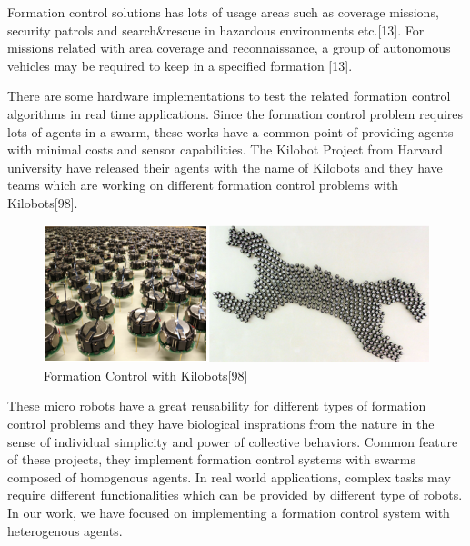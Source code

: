 Formation control solutions has lots of usage areas such as coverage missions, security patrols and search$\&$rescue in hazardous environments etc.[13]. For missions related with area coverage and reconnaissance, a group of autonomous vehicles may be required to keep in a specified formation [13].  

There are some hardware implementations to test the related formation control algorithms in real time applications. Since the formation control problem requires lots of agents in a swarm, these works have a common point of providing agents with minimal costs and sensor capabilities. The Kilobot Project from Harvard university have released their agents with the name of Kilobots and they have teams which are working on different formation control problems with Kilobots[98].

\begin{figure}[H]
\caption{Formation Control with Kilobots[98]}
\centering
\includegraphics[scale = 0.70]{kilobot}
\end{figure}

These micro robots have a great reusability for different types of formation control problems  and they have biological insprations from the nature in the sense of individual simplicity and power of collective behaviors. Common feature of these projects, they implement formation control systems with swarms composed of homogenous agents. In real world applications, complex tasks may require different functionalities which can be provided by different type of robots. In our work, we have focused on implementing a formation control system with heterogenous agents.

